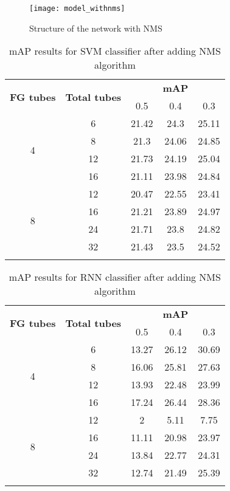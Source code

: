 \begin{figure}[h]
  \centering
  \texttt{[image: model\_withnms]}
  \caption{Structure of the network with NMS}
  \label{fig:network_nms}
\end{figure}

\begin{center}
  \begin{longtable}{|| c | c || c c c ||}
    \hline
    \multirow{2}{*}{\textbf{FG tubes}} & \multirow{2}{*}{\textbf{Total tubes}} & {} & \textbf{mAP} & {} \\
    {} & {} & 0.5 & 0.4 & 0.3 \\
    \hline
    \multirow{4}{*}{4} & 6 & 21.42 & 24.3 & 25.11 \\
    \cline{2-5}
    {} & 8 & 21.3 & 24.06 & 24.85 \\
    \cline{2-5}
    {} & 12 & 21.73 & 24.19 & 25.04 \\
    \cline{2-5}
    {} & 16 & 21.11 & 23.98 & 24.84 \\
    \hline
    \multirow{4}{*}{8} & 12 & 20.47 & 22.55 & 23.41 \\
    \cline{2-5}
    {} & 16 & 21.21 & 23.89 & 24.97 \\
    \cline{2-5}
    {} & 24 & 21.71 & 23.8 & 24.82 \\
    \cline{2-5}
    {} & 32 & 21.43 & 23.5 & 24.52 \\
    \hline

  \caption{mAP results for SVM classifier after adding NMS algorithm}
  \label{table:svm_nms}
\end{longtable}
\end{center}

\begin{center}
  \begin{longtable}{|| c | c || c c c ||}
    \hline
    \multirow{2}{*}{\textbf{FG tubes}} & \multirow{2}{*}{\textbf{Total tubes}} & {} & \textbf{mAP} & {} \\
    {} & {} & 0.5 & 0.4 & 0.3 \\
    \hline
    \multirow{4}{*}{4} & 6 & 13.27 & 26.12 & 30.69  \\
    \cline{2-5}
    {} & 8 & 16.06 & 25.81 & 27.63 \\
    \cline{2-5}
    {} & 12 & 13.93 & 22.48 & 23.99 \\
    \cline{2-5}
    {} & 16 & 17.24 & 26.44 & 28.36 \\
    \hline
    \multirow{4}{*}{8} & 12 & 2 & 5.11 & 7.75 \\
    \cline{2-5}
    {} & 16 & 11.11 & 20.98 & 23.97 \\
    \cline{2-5}
    {} & 24 & 13.84 & 22.77 & 24.31 \\
    \cline{2-5}
    {} & 32 & 12.74 & 21.49 & 25.39 \\
    \hline

  \caption{mAP results for RNN classifier after adding NMS algorithm}
  \label{table:rnn_nms}
\end{longtable}
\end{center}

